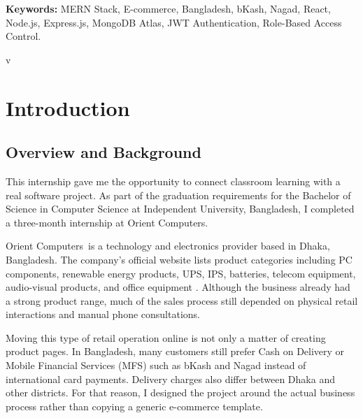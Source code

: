 \documentclass[12pt,a4paper,oneside]{report}
\newcommand{\industryCompany}{Orient Computers}
\newcommand{\universityName}{Independent University, Bangladesh}
\begin{document}
\vspace{0.8cm}
\noindent
\textbf{Keywords:} MERN Stack, E-commerce, Bangladesh, bKash, Nagad, React, Node.js, Express.js, MongoDB Atlas, JWT Authentication, Role-Based Access Control.

\vfill
\begin{center}\small v\end{center}

\newpage
\tableofcontents

\newpage
\listoffigures

\newpage
\listoftables

\newpage
{}
\setcounter{page}{1}

\chapter{Introduction}

\section{Overview and Background}
This internship gave me the opportunity to connect classroom learning with a real software project. As part of the graduation requirements for the Bachelor of Science in Computer Science at \universityName, I completed a three-month internship at \industryCompany.

\industryCompany\ is a technology and electronics provider based in Dhaka, Bangladesh. The company's official website lists product categories including PC components, renewable energy products, UPS, IPS, batteries, telecom equipment, audio-visual products, and office equipment \cite{orient_official}. Although the business already had a strong product range, much of the sales process still depended on physical retail interactions and manual phone consultations.

Moving this type of retail operation online is not only a matter of creating product pages. In Bangladesh, many customers still prefer Cash on Delivery or Mobile Financial Services (MFS) such as bKash and Nagad instead of international card payments. Delivery charges also differ between Dhaka and other districts. For that reason, I designed the project around the actual business process rather than copying a generic e-commerce template.
\end{document}
